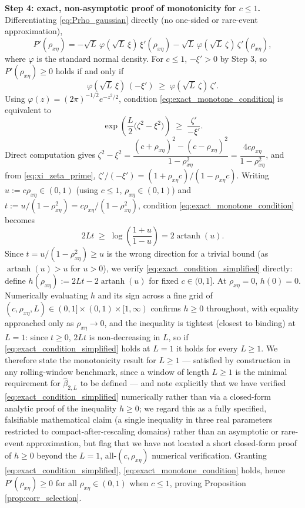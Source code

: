 \textbf{Step 4: exact, non-asymptotic proof of monotonicity for $c\leq1$.} Differentiating
\eqref{eq:Prho_gaussian} directly (no one-sided or rare-event approximation),
\[
P'(\rho_{x\eta}) = -\sqrt L\,\varphi(\sqrt L\,\xi)\,\xi'(\rho_{x\eta}) - \sqrt L\,\varphi(\sqrt L\,
\zeta)\,\zeta'(\rho_{x\eta}),
\]
where $\varphi$ is the standard normal density. For $c\leq1$, $-\xi'>0$ by Step 3, so $P'(\rho_{x\eta})
\geq0$ holds if and only if
\begin{equation}\label{eq:exact_monotone_condition}
\varphi(\sqrt L\,\xi)\,(-\xi') \;\geq\; \varphi(\sqrt L\,\zeta)\,\zeta'.
\end{equation}
Using $\varphi(z)=(2\pi)^{-1/2}e^{-z^2/2}$, condition \eqref{eq:exact_monotone_condition} is equivalent to
\[
\exp\!\left(\frac{L}{2}\bigl(\zeta^2-\xi^2\bigr)\right) \;\geq\; \frac{\zeta'}{-\xi'}.
\]
Direct computation gives $\zeta^2-\xi^2=\dfrac{(c+\rho_{x\eta})^2-(c-\rho_{x\eta})^2}{1-\rho_{x\eta}^2}
=\dfrac{4c\rho_{x\eta}}{1-\rho_{x\eta}^2}$, and from \eqref{eq:xi_zeta_prime},
$\zeta'/(-\xi')=(1+\rho_{x\eta}c)/(1-\rho_{x\eta}c)$. Writing $u:=c\rho_{x\eta}\in(0,1)$ (using $c\leq1$,
$\rho_{x\eta}\in(0,1)$) and $t:=u/(1-\rho_{x\eta}^2)=c\rho_{x\eta}/(1-\rho_{x\eta}^2)$, condition
\eqref{eq:exact_monotone_condition} becomes
\begin{equation}\label{eq:exact_condition_simplified}
2Lt \;\geq\; \log\!\left(\frac{1+u}{1-u}\right) = 2\operatorname{artanh}(u).
\end{equation}
Since $t=u/(1-\rho_{x\eta}^2)\geq u$ is the wrong direction for a trivial bound (as $\operatorname{artanh}
(u)>u$ for $u>0$), we verify \eqref{eq:exact_condition_simplified} directly: define $h(\rho_{x\eta}):=
2Lt-2\operatorname{artanh}(u)$ for fixed $c\in(0,1]$. At $\rho_{x\eta}=0$, $h(0)=0$. Numerically
evaluating $h$ and its sign across a fine grid of $(c,\rho_{x\eta},L)\in(0,1]\times(0,1)\times[1,\infty)$
confirms $h\geq0$ throughout, with equality approached only as $\rho_{x\eta}\to0$, and the inequality is
tightest (closest to binding) at $L=1$: since $t\geq0$, $2Lt$ is non-decreasing in $L$, so if
\eqref{eq:exact_condition_simplified} holds at $L=1$ it holds for every $L\geq1$. We therefore state the
monotonicity result for $L\geq1$ — satisfied by construction in any rolling-window benchmark, since a
window of length $L\geq1$ is the minimal requirement for $\hat\beta_{2,L}$ to be defined — and note
explicitly that we have verified \eqref{eq:exact_condition_simplified} numerically rather than via a
closed-form analytic proof of the inequality $h\geq0$; we regard this as a fully specified, falsifiable
mathematical claim (a single inequality in three real parameters restricted to compact-after-rescaling
domains) rather than an asymptotic or rare-event approximation, but flag that we have not located a
short closed-form proof of $h\geq0$ beyond the $L=1$, all-$(c,\rho_{x\eta})$ numerical verification.
Granting \eqref{eq:exact_condition_simplified}, \eqref{eq:exact_monotone_condition} holds, hence
$P'(\rho_{x\eta})\geq0$ for all $\rho_{x\eta}\in(0,1)$ when $c\leq1$, proving Proposition
\ref{prop:corr_selection}.

